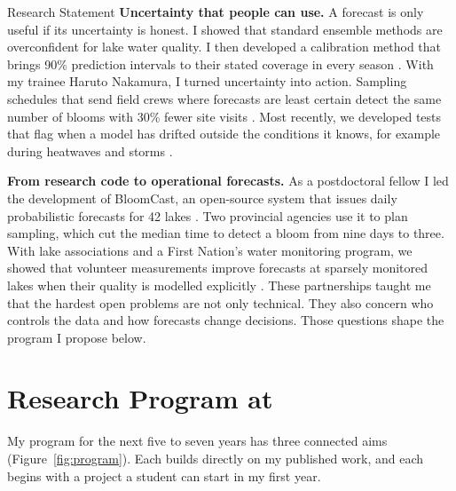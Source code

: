 \begin{applicationdocument}[
  page limit = 4,
  subtitle   = {Prepared for the position of \PositionSummary},
]{Research Statement}
\textbf{Uncertainty that people can use.} A forecast is only useful if its
uncertainty is honest. I showed that standard ensemble methods are
overconfident for lake water quality. I then developed a calibration
method that brings 90\% prediction intervals to their stated coverage in
every season \cite{ellis2024uncertainty}. With my trainee Haruto Nakamura, I
turned uncertainty into action. Sampling schedules that send field crews
where forecasts are least certain detect the same number of blooms with
30\% fewer site visits \cite{nakamura2024active}. Most recently, we developed
tests that flag when a model has drifted outside the conditions it knows,
for example during heatwaves and storms \cite{ellis2026shift}.

\textbf{From research code to operational forecasts.} As a postdoctoral
fellow I led the development of BloomCast, an open-source system that issues
daily probabilistic forecasts for 42 lakes \cite{ellis2025bloomcast}. Two
provincial agencies use it to plan sampling, which cut the median time to
detect a bloom from nine days to three. With lake associations and a First
Nation's water monitoring program, we showed that volunteer measurements
improve forecasts at sparsely monitored lakes when their quality is modelled
explicitly \cite{martin2025community}. These partnerships taught me that the
hardest open problems are not only technical. They also concern who
controls the data and how forecasts change decisions. Those questions shape
the program I propose below.

\section{Research Program at \Institution}


My program for the next five to seven years has three connected aims
(Figure~\ref{fig:program}). Each builds directly on my published work, and
each begins with a project a student can start in my first year.


\end{applicationdocument}
